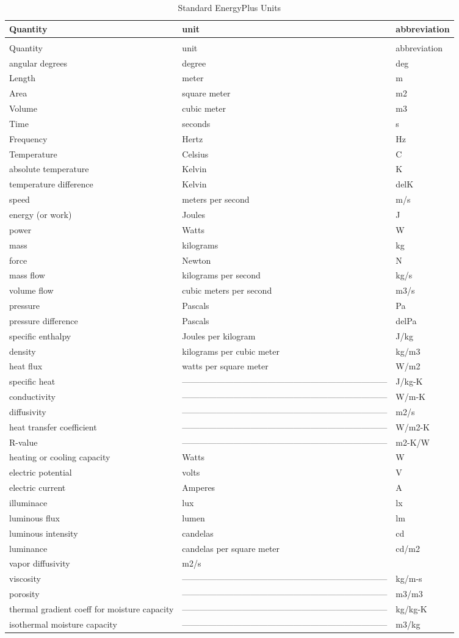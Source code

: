 \begin{longtable}[c]{p{1.59in}p{2.9in}p{1.5in}}
\caption{Standard EnergyPlus Units \label{table:standard-energyplus-units}} \tabularnewline
\toprule
Quantity & unit & abbreviation \tabularnewline
\midrule
\endfirsthead

\caption[]{Standard EnergyPlus Units} \tabularnewline
\toprule
Quantity & unit & abbreviation \tabularnewline
\midrule
\endhead

angular degrees & degree & deg \tabularnewline
Length & meter & m \tabularnewline
Area & square meter & m2 \tabularnewline
Volume & cubic meter & m3 \tabularnewline
Time & seconds & s \tabularnewline
Frequency & Hertz & Hz \tabularnewline
Temperature & Celsius & C \tabularnewline
absolute temperature & Kelvin & K \tabularnewline
temperature difference & Kelvin & delK \tabularnewline
speed & meters per second & m/s \tabularnewline
energy (or work) & Joules & J \tabularnewline
power & Watts & W \tabularnewline
mass & kilograms & kg \tabularnewline
force & Newton & N \tabularnewline
mass flow & kilograms per second & kg/s \tabularnewline
volume flow & cubic meters per second & m3/s \tabularnewline
pressure & Pascals & Pa \tabularnewline
pressure difference & Pascals & delPa \tabularnewline
specific enthalpy & Joules per kilogram & J/kg \tabularnewline
density & kilograms per cubic meter & kg/m3 \tabularnewline
heat flux & watts per square meter & W/m2 \tabularnewline
specific heat & ------------------------------------------------------------------------ & J/kg-K \tabularnewline
conductivity & ------------------------------------------------------------------------ & W/m-K \tabularnewline
diffusivity & ------------------------------------------------------------------------ & m2/s \tabularnewline
heat transfer coefficient & ------------------------------------------------------------------------ & W/m2-K \tabularnewline
R-value & ------------------------------------------------------------------------ & m2-K/W \tabularnewline
heating or cooling capacity & Watts & W \tabularnewline
electric potential & volts & V \tabularnewline
electric current & Amperes & A \tabularnewline
illuminace & lux & lx \tabularnewline
luminous flux & lumen & lm \tabularnewline
luminous intensity & candelas & cd \tabularnewline
luminance & candelas per square meter & cd/m2 \tabularnewline
vapor diffusivity & m2/s & ~ \tabularnewline
viscosity & ------------------------------------------------------------------------ & kg/m-s \tabularnewline
porosity & ------------------------------------------------------------------------ & m3/m3 \tabularnewline
thermal gradient coeff for moisture capacity & ------------------------------------------------------------------------ & kg/kg-K \tabularnewline
isothermal moisture capacity & ------------------------------------------------------------------------ & m3/kg \tabularnewline
\bottomrule
\end{longtable}
